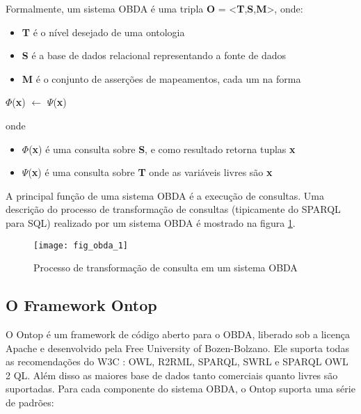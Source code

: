 Formalmente, um sistema OBDA é uma tripla \cite{bagosi2014ontop} \textbf{O}
= <\textbf{T},\textbf{S},\textbf{M}>, onde:

\begin{itemize}

    \item \textbf{T} é o nível desejado de uma ontologia

    \item \textbf{S} é a base de dados relacional representando a fonte de dados

    \item \textbf{M} é o conjunto de asserções de mapeamentos, cada um na forma

\end{itemize}

\begin{center}
    $\Phi$(\textbf{x}) $\leftarrow$ $\Psi$(\textbf{x})
\end{center}

onde

\begin{itemize}

    \item $\Phi$(\textbf{x}) é uma consulta sobre \textbf{S}, e como
    resultado retorna tuplas \textbf{x}

    \item $\Psi$(\textbf{x}) é uma consulta sobre \textbf{T} onde as
    variáveis livres são \textbf{x}

\end{itemize}

A principal função de uma sistema OBDA é a execução de consultas. Uma descrição
do processo de transformação de consultas (tipicamente do SPARQL para SQL)
realizado por um sistema OBDA é mostrado na figura \ref{fig:fig_obda_1}.

\begin{figure}[!h]
  \centering
  \texttt{[image: fig\_obda\_1]}
  \caption{Processo de transformação de consulta em um sistema OBDA}
  \label{fig:fig_obda_1}
\end{figure}

\subsection{O Framework Ontop}
\label{sec:ontop}

O Ontop é um framework de código aberto para o OBDA, liberado sob a licença
Apache e desenvolvido pela Free University of Bozen-Bolzano. Ele suporta todas as
recomendações do W3C \cite{bagosi2014ontop}: OWL, R2RML, SPARQL, SWRL e SPARQL
OWL 2 QL. Além disso as maiores base de dados tanto comerciais quanto livres são
suportadas. Para cada componente do sistema OBDA, o Ontop suporta uma série de padrões:

